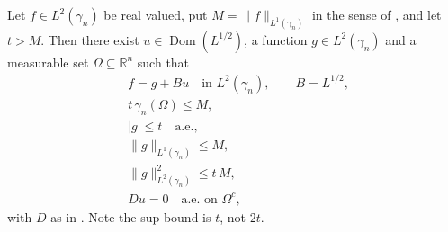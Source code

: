 \begin{lemma}
Let $f \in L^2(\gamma_n)$ be real valued, put $M = \|f\|_{L^1(\gamma_n)}$ in the
sense of , and let $t > M$.  Then there exist
$u \in \operatorname{Dom}(L^{1/2})$, a function $g \in L^2(\gamma_n)$ and a
measurable set $\Omega \subseteq \mathbb{R}^n$ such that
\begin{align*}
  &f = g + Bu \quad\text{in } L^2(\gamma_n), \qquad B = L^{1/2},\\
  &t\,\gamma_n(\Omega) \leq M,\\
  &|g| \leq t \quad\text{a.e.},\\
  &\|g\|_{L^1(\gamma_n)} \leq M,\\
  &\|g\|_{L^2(\gamma_n)}^2 \leq t\,M,\\
  &Du = 0 \quad\text{a.e. on } \Omega^c ,
\end{align*}
with $D$ as in .  Note the sup bound is $t$, not $2t$.
\end{lemma}
